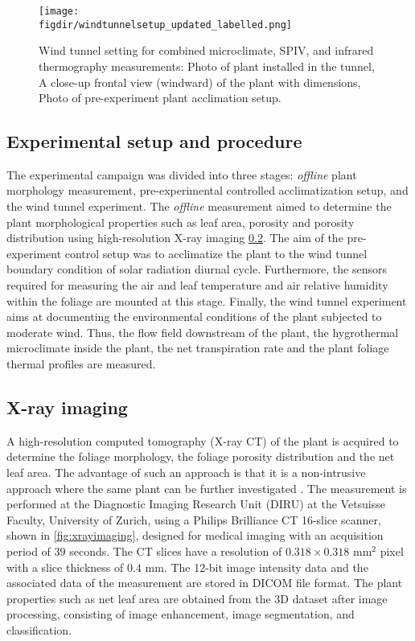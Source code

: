 \begin{figure}[t]
	\centering
	\texttt{[image: \\figdir/windtunnelsetup\_updated\_labelled.png]}
	\caption{Wind tunnel setting for combined microclimate, SPIV, and infrared thermography measurements:  Photo of plant installed in the tunnel,  A close-up frontal view (windward) of the plant with dimensions,  Photo of pre-experiment plant acclimation setup.}
	\label{fig:plant_setup}
\end{figure}


\subsection{Experimental setup and procedure}

The experimental campaign was divided into three stages: \textit{offline} plant morphology measurement, pre-experimental controlled acclimatization setup, and the wind tunnel experiment. The \textit{offline} measurement aimed to determine the plant morphological properties such as leaf area, porosity and porosity distribution using high-resolution X-ray imaging \cref{subsec:xray}. The aim of the pre-experiment control setup was to acclimatize the plant to the wind tunnel boundary condition of solar radiation diurnal cycle. Furthermore, the sensors required for measuring the air and leaf temperature and air relative humidity within the foliage are mounted at this stage. Finally, the wind tunnel experiment aims at documenting the environmental conditions of the plant subjected to moderate wind. Thus, the flow field downstream of the plant, the hygrothermal microclimate inside the plant, the net transpiration rate and the plant foliage thermal profiles are measured.

\subsection{X-ray imaging}
\label{subsec:xray}

A high-resolution computed tomography (X-ray CT) of the plant is acquired to determine the foliage morphology, the foliage porosity distribution and the net leaf area. The advantage of such an approach is that it is a non-intrusive approach where the same plant can be further investigated \citep{Lal2017,Patera2018}. The measurement is performed at the Diagnostic Imaging Research Unit (DIRU) at the Vetsuisse Faculty, University of Zurich, using a Philips Brilliance CT 16-slice scanner, shown in \cref{fig:xrayimaging}, designed for medical imaging with an acquisition period of $39$ seconds. The CT slices have a resolution of $0.318\times0.318$  mm$^2$ pixel with a slice thickness of $0.4$ mm. The 12-bit image intensity data and the associated data of the measurement are stored in DICOM file format. The plant properties such as net leaf area are obtained from the 3D dataset after image processing, consisting of image enhancement, image segmentation, and classification.

